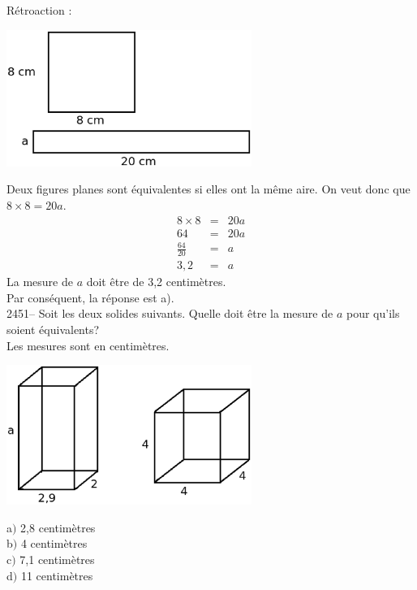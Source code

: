 \documentclass[letterpaper, 12pt]{article}
\begin{document}
R\'etroaction :\\
\begin{center}
 \includegraphics[width=8cm,bb=0 536 571 842]{Q2450.eps}
\end{center}
Deux figures planes sont \'equivalentes si elles ont la m\^eme aire. On veut donc que $8\times 8 = 20 a$.
\begin{eqnarray*}
 8\times 8 &=& 20 a\\
 64 &=& 20 a\\[2mm]
 \frac{64}{20} &=& a\\[2mm]
 3,2 &=& a
\end{eqnarray*}
La mesure de $a$ doit \^etre de 3,2 centim\`etres.\\
Par cons\'equent, la r\'eponse est a).\\

2451-- Soit les deux solides suivants. Quelle doit \^etre la mesure de $a$ pour qu'ils soient \'equivalents?\\
Les mesures sont en centim\`etres.
\begin{center}
 \includegraphics[width=8cm,bb=0 536 571 842]{Q2451.eps}
\end{center}
a$)$ 2,8 centim\`etres\\
b$)$ 4 centim\`etres\\
c$)$ 7,1 centim\`etres\\
d$)$ 11 centim\`etres\\
\end{document}
